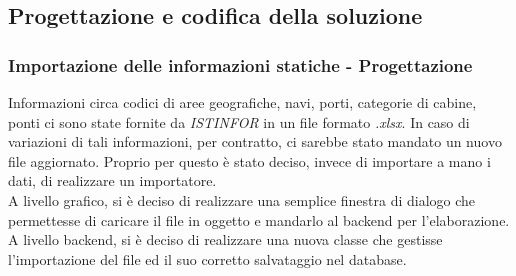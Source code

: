\subsection{Progettazione e codifica della soluzione}
\subsubsection{Importazione delle informazioni statiche - Progettazione}
Informazioni circa codici di aree geografiche, navi, porti, categorie di cabine, ponti ci sono state fornite da \textit{ISTINFOR} in un file formato \textit{.xlsx}. In caso di variazioni di tali informazioni, per contratto, ci sarebbe stato mandato un nuovo file aggiornato. Proprio per questo è stato deciso, invece di importare a mano i dati, di realizzare un importatore.\\
A livello grafico, si è deciso di realizzare una semplice finestra di dialogo che permettesse di caricare il file in oggetto e mandarlo al backend per l'elaborazione. A livello backend, si è deciso di realizzare una nuova classe che gestisse l'importazione del file ed il suo corretto salvataggio nel database.

